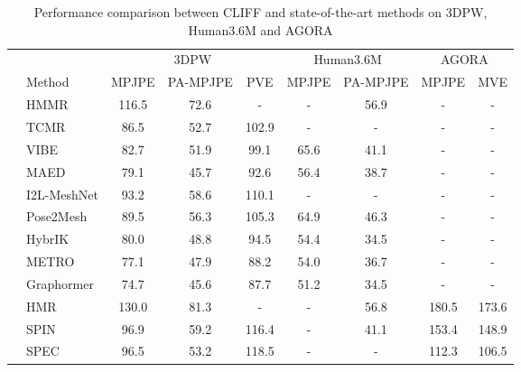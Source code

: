 \documentclass[runningheads]{llncs}
\begin{document}
\begin{table}[t]\scriptsize
	\centering
	\caption{Performance comparison between CLIFF and state-of-the-art methods on 3DPW, Human3.6M and AGORA}
	\label{table:sota}
	\begin{tabular}{clccccccc}
		\toprule
		\multicolumn{1}{l}{} &      & \multicolumn{3}{c}{3DPW}                                      & \multicolumn{2}{c}{Human3.6M}                & \multicolumn{2}{c}{AGORA}                   \\
		\cmidrule(lr){3-5}\cmidrule(lr){6-7}\cmidrule(lr){8-9}
		\multicolumn{1}{l}{} & Method          &
		\multicolumn{1}{c}{MPJPE } & \multicolumn{1}{c}{PA-MPJPE } & \multicolumn{1}{c}{PVE } & \multicolumn{1}{c}{MPJPE } & \multicolumn{1}{c}{PA-MPJPE } & \multicolumn{1}{c}{MPJPE } & \multicolumn{1}{c}{MVE }  \\
		\midrule
		\multirow{4}{*}{\rotatebox{90}{video}}
		& HMMR \cite{kanazawa2019learning}	& 116.5 & 72.6   & -    & -    & 56.9   & -    & -     \\
		& TCMR \cite{choi2021beyond}		& 86.5 & 52.7   & 102.9 & -    & -      & -    & -     \\
		& VIBE \cite{kocabas2020vibe} 		& 82.7 & 51.9   & 99.1 & 65.6 & 41.1   & -    & -     \\
		& MAED \cite{wan2021encoder} 		& 79.1 & 45.7   & 92.6 & 56.4 & 38.7   & -    & -     \\
		\midrule
		\multirow{5}{*}{\rotatebox{90}{model-free}}
		& I2L-MeshNet \cite{moon2020i2l}     & 93.2 & 58.6   & 110.1 & -    & -      & -    & -     \\
		& Pose2Mesh \cite{choi2020pose2mesh}       & 89.5 & 56.3   & 105.3 & 64.9 & 46.3   & -    & -     \\
		& HybrIK \cite{li2021hybrik}         & 80.0 & 48.8   & 94.5 & 54.4 & 34.5   & -    & -     \\
		& METRO \cite{lin2021end}           & 77.1 & 47.9   & 88.2 & 54.0 & 36.7   & -    & -     \\
		& Graphormer \cite{lin2021mesh} & 74.7 & 45.6   & 87.7 & 51.2 & 34.5   & -    & -     \\
		\midrule
		\multirow{9}{*}{\rotatebox{90}{model-based}}
		& HMR \cite{kanazawa2018end}  & 130.0 & 81.3   & -    & -    & 56.8   & 180.5 & 173.6 \\
		& SPIN \cite{kolotouros2019learning} & 96.9 & 59.2   & 116.4 & -    & 41.1   & 153.4 & 148.9 \\
		& SPEC \cite{kocabas2021spec} & 96.5 & 53.2   & 118.5 & -    & -      & 112.3 & 106.5 \\

\end{tabular}
\end{table}
\end{document}
